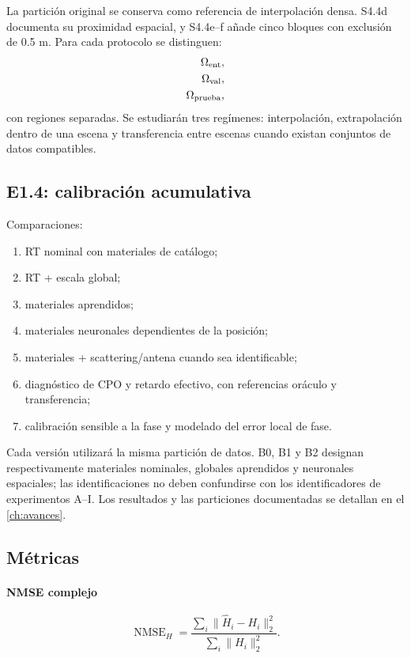 La partición original se conserva como referencia de interpolación densa. S4.4d documenta su proximidad espacial, y S4.4e--f añade cinco bloques con exclusión de 0.5 m. Para cada protocolo se distinguen:
\begin{align}
\Omega_{\rm ent}&,\\
\Omega_{\rm val}&,\\
\Omega_{\rm prueba}&,
\end{align}
con regiones separadas. Se estudiarán tres regímenes: interpolación, extrapolación dentro de una escena y transferencia entre escenas cuando existan conjuntos de datos compatibles.

\subsection{E1.4: calibración acumulativa}

Comparaciones:
\begin{enumerate}
\item RT nominal con materiales de catálogo;
\item RT + escala global;
\item materiales aprendidos;
\item materiales neuronales dependientes de la posición;
\item materiales + scattering/antena cuando sea identificable;
\item diagnóstico de CPO y retardo efectivo, con referencias oráculo y transferencia;
\item calibración sensible a la fase y modelado del error local de fase.
\end{enumerate}
Cada versión utilizará la misma partición de datos. B0, B1 y B2 designan respectivamente materiales nominales, globales aprendidos y neuronales espaciales; las identificaciones no deben confundirse con los identificadores de experimentos A--I. Los resultados y las particiones documentadas se detallan en el \cref{ch:avances}.

\subsection{Métricas}

\paragraph{NMSE complejo}
\begin{equation}
\operatorname{NMSE}_H=
\frac{\sum_i\|\widehat H_i-H_i\|_2^2}
{\sum_i\|H_i\|_2^2}.
\end{equation}

